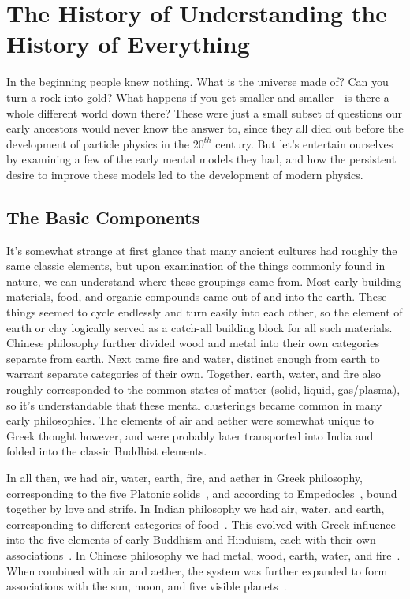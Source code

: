 \chapter{The History of Understanding the History of Everything}

In the beginning people knew nothing. What is the universe made of? Can you turn a rock into gold? What happens if you get smaller and smaller - is there a whole different world down there? These were just a small subset of questions our early ancestors would never know the answer to, since they all died out before the development of particle physics in the $20^{th}$ century. But let's entertain ourselves by examining a few of the early mental models they had, and how the persistent desire to improve these models led to the development of modern physics.

\section{The Basic Components}

It's somewhat strange at first glance that many ancient cultures had roughly the same classic elements, but upon examination of the things commonly found in nature, we can understand where these groupings came from. Most early building materials, food, and organic compounds came out of and into the earth. These things seemed to cycle endlessly and turn easily into each other, so the element of earth or clay logically served as a catch-all building block for all such materials. Chinese philosophy further divided wood and metal into their own categories separate from earth. Next came fire and water, distinct enough from earth to warrant separate categories of their own. Together, earth, water, and fire also roughly corresponded to the common states of matter (solid, liquid, gas/plasma), so it's understandable that these mental clusterings became common in many early philosophies. The elements of air and aether were somewhat unique to Greek thought however, and were probably later transported into India and folded into the classic Buddhist elements.

In all then, we had air, water, earth, fire, and aether in Greek philosophy, corresponding to the five Platonic solids~\cite{Plato}, and according to Empedocles~\cite{Empedocles}, bound together by love and strife. In Indian philosophy we had air, water, and earth, corresponding to different categories of food~\cite{Chandogya}. This evolved with Greek influence into the five elements of early Buddhism and Hinduism, each with their own associations~\cite{friesian}. In Chinese philosophy we had metal, wood, earth, water, and fire~\cite{Tao}. When combined with air and aether, the system was further expanded to form associations with the sun, moon, and five visible planets~\cite{friesian}.

